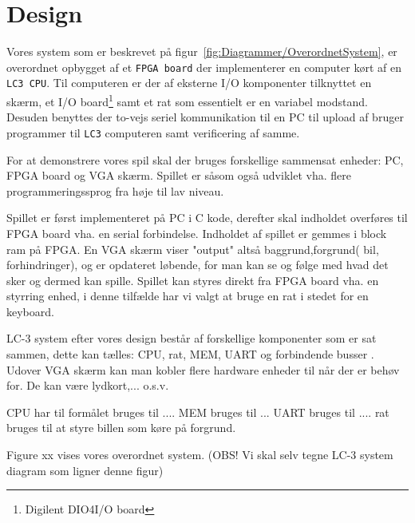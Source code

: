 \chapter{Design}\label{cha:design}
Vores system som er beskrevet på figur~\vref{fig:Diagrammer/OverordnetSystem}, er overordnet opbygget af et \texttt{FPGA board} der implementerer en computer kørt af en \texttt{LC3 CPU}. Til computeren er der af eksterne I/O komponenter tilknyttet en skærm, et I/O board\footnote{Digilent DIO4\texttrademark I/O board} samt et rat som essentielt er en variabel modstand. Desuden benyttes der to-vejs seriel kommunikation til en PC til upload af bruger programmer til \texttt{LC3} computeren samt verificering af samme.


For at demonstrere vores spil skal der bruges forskellige sammensat enheder: PC, FPGA board og VGA skærm. Spillet er såsom også udviklet vha. flere programmeringssprog fra høje til lav niveau.

Spillet er først implementeret på PC i C kode, derefter skal indholdet overføres til FPGA board vha. en serial forbindelse. Indholdet af spillet er gemmes i block ram på FPGA. En VGA skærm viser "output" altså baggrund,forgrund( bil, forhindringer), og er opdateret løbende, for man kan se og følge med hvad det sker og dermed kan spille. Spillet kan styres direkt fra FPGA board vha. en styrring enhed, i denne tilfælde har vi valgt at bruge en rat i stedet for en keyboard.

LC-3 system efter vores design består af forskellige komponenter som er sat sammen, dette kan tælles: CPU, rat, MEM, UART og  forbindende busser . Udover VGA skærm kan man kobler flere hardware enheder til når der er behøv for. De kan være lydkort,... o.s.v.

CPU har til formålet bruges til ....
MEM bruges til ...
UART bruges til ....
rat bruges til at styre billen som køre på forgrund.

Figure xx vises vores overordnet system.
(OBS! Vi skal selv tegne LC-3 system diagram som ligner denne figur)